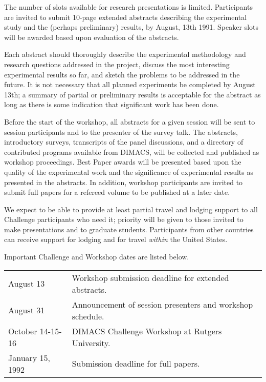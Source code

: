 The number of slots available for research presentations is limited.
Participants are invited to submit 10-page extended abstracts
describing the experimental study and the (perhaps preliminary)
results, by August, 13th 1991.  Speaker slots will be awarded based
upon evaluation of the abstracts.

Each abstract should thoroughly describe the experimental methodology
and research questions addressed in the project, discuss the most
interesting experimental results so far, and sketch the problems to be
addressed in the future.  It is not necessary that all planned
experiments be completed by August 13th; a summary of partial or
preliminary results is acceptable for the abstract as long as there is
some indication that significant work has been done.

Before the start of the workshop, all abstracts for a given session
will be sent to session participants and to the presenter of the
survey talk.  The abstracts, introductory surveys, transcripts of the
panel discussions, and a directory of contributed programs available
from DIMACS, will be collected and published as workshop proceedings.
Best Paper awards will be presented based upon the quality of the
experimental work and the significance of experimental results as
presented in the abstracts.  In addition, workshop participants are
invited to submit full papers for a refereed volume to be published at
a later date.

We expect to be able to provide at least partial travel and lodging
support to all Challenge participants who need it; priority will be
given to those invited to make presentations and to graduate students.
Participants from other countries can receive support for lodging and
for travel {\em within} the United States.

Important Challenge and Workshop dates are listed below.

\vspace{.2in} 

\begin{tabular}{ll}\hline 
August 13 & Workshop submission deadline for extended abstracts. \\
August 31 & Announcement of session presenters and workshop schedule.
\\ October 14-15-16 & DIMACS Challenge Workshop at Rutgers
University.\\ January 15, 1992 & Submission deadline for full papers.
\\ \hline
\end{tabular}

